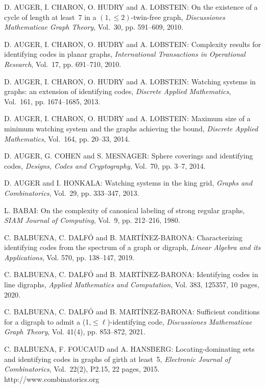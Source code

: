 \begin{thebibliography}{999}
D. AUGER, I. CHARON, O. HUDRY and A. LOBSTEIN: On the existence of a cycle of length at least~7 in a $(1,\leq 2)$-twin-free graph, {\it Discussiones Mathematicae Graph Theory}, Vol.~30, pp. 591--609, 2010.

D. AUGER, I. CHARON, O. HUDRY and A. LOBSTEIN: Complexity results for identifying codes in planar graphs, {\it International Transactions in Operational Research}, Vol.~17, pp. 691--710, 2010.

D. AUGER, I. CHARON, O. HUDRY and A. LOBSTEIN: Watching systems in graphs: an extension of identifying codes, {\it Discrete Applied Mathematics}, Vol.~161, pp. 1674--1685, 2013.

D. AUGER, I. CHARON, O. HUDRY and A. LOBSTEIN: Maximum size of a minimum watching system and the graphs achieving the bound, {\it Discrete Applied Mathematics}, Vol.~164, pp. 20--33, 2014.

D. AUGER, G. COHEN and S. MESNAGER: Sphere coverings and identifying codes, {\it Designs, Codes and Cryptography}, Vol.~70, pp. 3--7, 2014.

D. AUGER and I. HONKALA: Watching systems in the king grid, {\it Graphs and Combinatorics}, Vol.~29, pp. 333--347, 2013.

L. BABAI: On the complexity of canonical labeling of strong regular graphs, {\it SIAM Journal of Computing}, Vol.~9, pp. 212--216, 1980.

C. BALBUENA, C. DALF\'O and B. MART\'INEZ-BARONA: Characterizing identifying codes from the spectrum of a graph or digraph, {\it Linear Algebra and its Applications}, Vol. 570, pp. 138--147, 2019.

C. BALBUENA, C. DALF\'O and B. MART\'INEZ-BARONA: Identifying codes in line digraphs, {\it Applied Mathematics and Computation}, Vol. 383, 125357, 10 pages, 2020.

C. BALBUENA, C. DALF\'O and B. MART\'INEZ-BARONA: Sufficient conditions for a digraph to admit a (1,$\leq \ell$)-identifying code, {\it Discussiones Mathematicae Graph Theory}, Vol. 41(4), pp. 853--872, 2021.

C. BALBUENA, F. FOUCAUD and A. HANSBERG: Locating-dominating sets and identifying codes in graphs of girth at least~5, {\it Electronic Journal of Combinatorics}, Vol.~22(2), P2.15, 22 pages, 2015.\\
http://www.combinatorics.org


\end{thebibliography}

